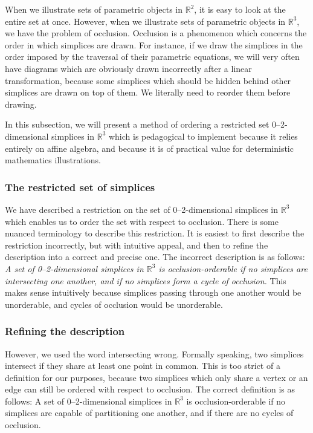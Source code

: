 When we illustrate sets of parametric objects in \(\mathbb{R}^{2}\), 
it is easy to look at the entire set at once. However, when we
illustrate sets of parametric objects in \(\mathbb{R}^{3}\), we
have the problem of occlusion. Occlusion is a phenomenon which 
concerns the order in which simplices are drawn. For instance,
if we draw the simplices in the order imposed by the traversal of 
their parametric equations, we will very often have diagrams which
are obviously drawn incorrectly after a linear transformation, 
because some simplices which should
be hidden behind other simplices are drawn on top of them. We literally 
need to reorder them before drawing.

In this subsection, we 
will present a method of ordering a restricted set 0--2-dimensional 
simplices in \(\mathbb{R}^{3}\) which is pedagogical to implement 
because it relies entirely on affine algebra, and because it is 
of practical value for deterministic mathematics illustrations.

\subsubsection{The restricted set of simplices}

We have described a restriction on the set of 0--2-dimensional simplices
in \(\mathbb{R}^{3}\) which enables us to order the set with respect to
occlusion. There is some nuanced terminology to describe this restriction.
It is easiest to first describe the restriction incorrectly, but with 
intuitive appeal, and then to refine the description into a correct
and precise one. The incorrect description is as follows:
\textit{A set of 0--2-dimensional simplices in \(\mathbb{R}^{3}\) is
occlusion-orderable if no simplices are intersecting one another, and 
if no simplices form a cycle of occlusion.} This makes sense
intuitively because simplices passing through one another would 
be unorderable, and cycles of occlusion would be unorderable.

\subsubsection{Refining the description}

However, we used the word intersecting wrong. Formally speaking,
two simplices intersect if they share at least one point in
common. This is too strict of a definition for our purposes,
because two simplices which only share a vertex or an edge can
still be ordered with respect to occlusion. The correct definition
is as follows: A set of 0--2-dimensional simplices in
\(\mathbb{R}^{3}\) is occlusion-orderable if no simplices
are capable of partitioning one another, and if there are no cycles of
occlusion.

